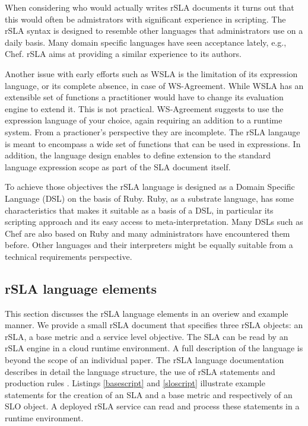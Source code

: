 When considering who would actually writes rSLA documents it turns out that this would often be admistrators with significant experience in scripting. The rSLA syntax is designed to resemble other languages that administrators use on a daily basis. Many domain specific languages have seen acceptance lately, e.g., Chef. rSLA aims at providing a similar experience to its authors.

Another issue with early efforts such as WSLA is the limitation of its expression language, or its complete absence, in case of WS-Agreement. While WSLA has an extensible set of functions a practitioner would have to change its evaluation engine to extend it. This is not practical. WS-Agreement suggests to use the expression language of your choice, again requiring an addition to a runtime system. From a practioner's perspective they are incomplete. The rSLA langauge is meant to encompass a wide set of functions that can be used in expressions. In addition, the language design enables to define extension to the standard language expression scope as part of the SLA document itself.

To achieve those objectives the rSLA language is designed as a Domain Specific Language (DSL) on the basis of Ruby. Ruby, as a substrate language, has some characteristics that makes it suitable as a basis of a DSL, in particular its scripting approach and its easy access to meta-interpretation. Many DSLs such as Chef are also based on Ruby and many administrators have encountered them before. Other languages and their interpreters might be equally suitable from a technical requirements perspective. 


\subsection{rSLA language elements}\label{editing}

This section discusses the rSLA language elements in an overiew and example manner. We provide a small  rSLA document that specifies three rSLA objects: an rSLA, a base metric and a service level objective. The SLA can be read by an rSLA engine in a cloud runtime environment. A full description of the language is beyond the scope of an individual paper. The rSLA language documentation describes in detail the language structure, the use of rSLA statements and production rules \cite{rSLAspec}.
Listings \ref{basescript} and \ref{sloscript} illustrate example statements for the creation of an SLA and a base metric and respectively of an SLO object. A deployed rSLA service can read and process these statements in a runtime environment. 


